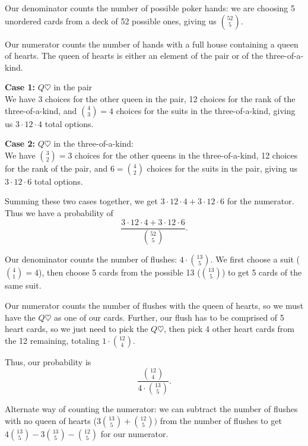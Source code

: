 \documentclass[12pt]{exam}
\begin{document}
\begin{solution}
\begin{qparts}
    \item Our denominator counts the number of possible poker hands: we are choosing 5 unordered cards from a deck of 52 possible ones, giving us $\binom{52}{5}$.
    
    Our numerator counts the number of hands with a full house containing a queen of hearts. The queen of hearts is either an element of the pair or of the three-of-a-kind.
    
    \textbf{Case 1:} $Q\heartsuit$ in the pair\\
    We have 3 choices for the other queen in the pair, 12 choices for the rank of the three-of-a-kind, and $\binom{4}{3} = 4 $ choices for the suits in the three-of-a-kind, giving us $3 \cdot 12 \cdot 4$ total options.
    
    \textbf{Case 2:} $Q\heartsuit$ in the three-of-a-kind:\\
    We have $\binom{3}{2} = 3$ choices for the other queens in the three-of-a-kind, 12 choices for the rank of the pair, and $6 = \binom{4}{2}$ choices for the suits in the pair, giving us $3 \cdot 12 \cdot 6$ total options.
    
    Summing these two cases together, we get $3 \cdot 12 \cdot 4 + 3 \cdot 12 \cdot 6 $ for the numerator. Thus we have a probability of
    $$\frac{3 \cdot 12 \cdot 4 + 3 \cdot 12 \cdot 6}{\binom{52}{5}}.$$
    
    \item Our denominator counts the number of flushes: $4 \cdot \binom{13}{5}$. We first choose a suit ($\binom{4}{1} = 4$), then choose 5 cards from the possible 13 ($\binom{13}{5}$) to get 5 cards of the same suit.
    
    Our numerator counts the number of flushes with the queen of hearts, so we must have the $Q\heartsuit$ as one of our cards. Further, our flush has to be comprised of 5 heart cards, so we just need to pick the $Q\heartsuit$, then pick 4 other heart cards from the 12 remaining, totaling $1 \cdot \binom{12}{4}$.
    
    Thus, our probability is
    $$\frac{\binom{12}{4}}{4 \cdot \binom{13}{5}}.$$
    
    Alternate way of counting the numerator: we can subtract the number of flushes with no queen of hearts ($3 \binom{13}{5} + \binom{12}{5})$ from the number of flushes to get $4 \binom{13}{5} - 3 \binom{13}{5} - \binom{12}{5}$ for our numerator.
    

\end{qparts}
\end{solution}
\end{document}
